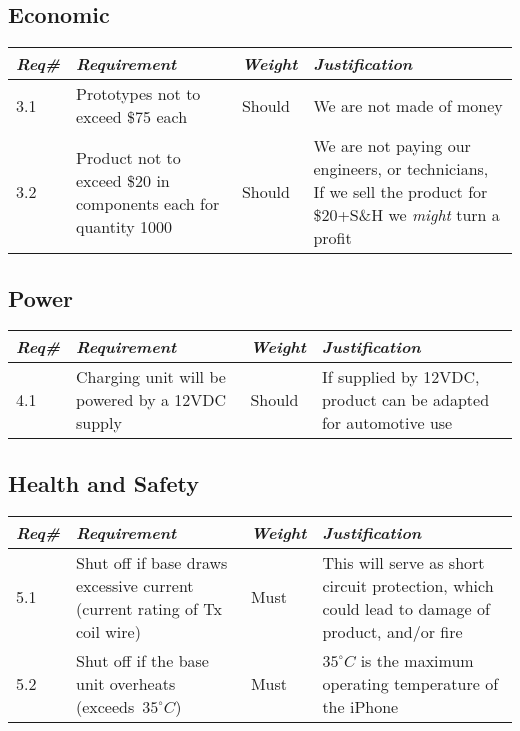             \subsection{Economic}
        \begin{centering}
        \begin{tabular}{|l|m{7cm}|l|m{7cm}|} \hline
        \textit{\textbf{Req\#}}	& \textit{\textbf{Requirement}} &\textit{\textbf{Weight}}&\textit{\textbf{Justification}} \\ \hline
        3.1 & Prototypes not to exceed \$75 each & Should & We are not made of money  \\ \hline
        3.2 & Product not to exceed \$20 in components each for quantity 1000 & Should & We are not paying our engineers, or technicians, If we sell the product for \$20+S\&H we \textit{might} turn a profit \\ \hline
        \end{tabular}
        \end{centering}    
    
\newpage
{}  %


  
    \subsection{Power }
        \begin{centering}
        \begin{tabular}{|l|m{7cm}|l|m{7cm}|} \hline
        \textit{\textbf{Req\#}}	& \textit{\textbf{Requirement}} &\textit{\textbf{Weight}}&\textit{\textbf{Justification}} \\ \hline
        4.1	& Charging unit will be powered by a 12VDC supply &	Should & If supplied by 12VDC, product can be adapted for automotive use \\ \hline
        \end{tabular}
        \end{centering}

    \subsection{Health and Safety }
        \begin{centering}
        \begin{tabular}{|l|m{7cm}|l|m{7cm}|} \hline
        \textit{\textbf{Req\#}}	& \textit{\textbf{Requirement}} &\textit{\textbf{Weight}}&\textit{\textbf{Justification}} \\ \hline
        5.1	& Shut off if base draws excessive current (current rating of Tx coil wire)	& Must &This will serve as short circuit protection, which could lead to damage of product, and/or fire \\ \hline
        5.2	& Shut off if the base unit overheats \mbox{(exceeds $35^{\circ}C$)}  & Must & $35^{\circ}C$ is the maximum operating temperature of the iPhone \cite{appletemp} \\ \hline
        \end{tabular}
        \end{centering}

